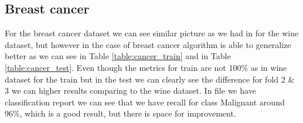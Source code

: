 \documentclass{article}
\begin{document}
\subsection{Breast cancer}
For the breast cancer dataset we can see similar picture as we had in for the wine dataset, but however in the
case of breast cancer algorithm is able to generalize better as we can see in Table \ref{table:cancer_train} and in 
Table \ref{table:cancer_test}. Even though the metrics for train are not 100\% as in wine dataset for the train
but in the test we can clearly see the difference for fold 2 \& 3 we can higher results comparing to the
wine dataset. In file  we have classification report we can see that we  have recall for class Malignant around 96\%, 
which is a good result, but there is space for improvement.
\end{document}
